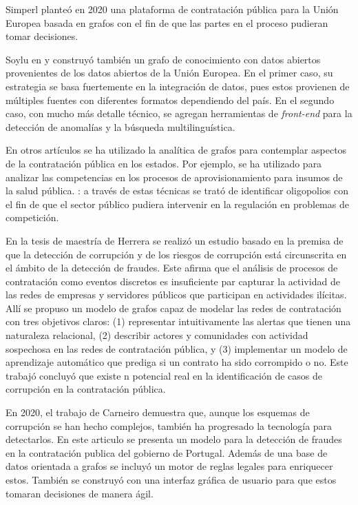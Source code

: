 \documentclass[11pt,letterpaper,oneside]{article}
\begin{document}
	Simperl \cite{Simperl-2018} planteó en 2020 una plataforma de contratación pública para la Unión Europea basada en grafos con el fin de que las partes en el proceso pudieran tomar decisiones.
	
	Soylu en \cite{Soylu-2020-1} y \cite{Soylu-2020-2} construyó también un grafo de conocimiento con datos abiertos provenientes de los datos abiertos de la Unión Europea. En el primer caso, su estrategia se basa fuertemente en la integración de datos, pues estos provienen de múltiples fuentes con diferentes formatos dependiendo del país. En el segundo caso, con mucho más detalle técnico, se agregan herramientas de {\em front-end} para la detección de anomalías y la búsqueda multilinguística.
	
	En otros artículos se ha utilizado la analítica de grafos para contemplar aspectos de la contratación pública en los estados. Por ejemplo, se ha utilizado para analizar las competencias en los procesos de aprovisionamiento para insumos de la salud pública. \cite{Fountoukidis-2021}: a través de estas técnicas se trató de identificar oligopolios con el fin de que el sector público pudiera intervenir en la regulación en problemas de competición.
	
	En la tesis de maestría de Herrera \cite{Herrera-2019} se realizó un estudio basado en la premisa de que la detección de corrupción y de los riesgos de corrupción está circunscrita en el ámbito de la detección de fraudes. Este afirma que el análisis de procesos de contratación como eventos discretos es insuficiente par capturar la actividad de las redes de empresas y servidores públicos que participan en actividades ilícitas. Allí se propuso un modelo de grafos capaz de modelar las redes de contratación con tres objetivos claros: (1) representar intuitivamente las alertas que tienen una naturaleza relacional, (2) describir actores y comunidades con actividad sospechosa en las redes de contratación pública, y (3) implementar un modelo de aprendizaje automático que prediga si un contrato ha sido corrompido o no. Este trabajó concluyó que existe n potencial real en la identificación de casos de corrupción en la contratación pública.
	
	En 2020, el trabajo de Carneiro \cite{Carneiro-2020} demuestra que, aunque los esquemas de corrupción se han hecho complejos, también ha progresado la tecnología para detectarlos. En este articulo se presenta un modelo para la detección de fraudes en la contratación publica del gobierno de Portugal. Además de una base de datos orientada a grafos se incluyó un motor de reglas legales para enriquecer estos. También se construyó con una interfaz gráfica de usuario para que estos tomaran decisiones de manera ágil.
	
\end{document}
